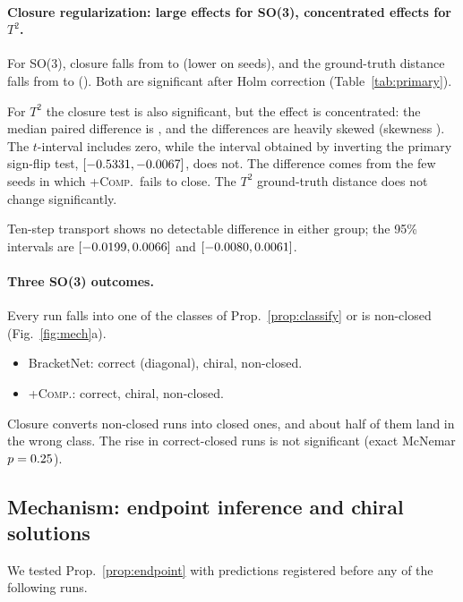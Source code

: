 \paragraph{Closure regularization: large effects for SO(3), concentrated effects for $T^2$.}
For SO(3), closure falls from \NHoneSOthreeMeanb{} to \NHoneSOthreeMeana{} (lower on \NHoneSOthreeWins{} seeds), and
the ground-truth distance falls from \NHtwoSOthreeMeanb{} to \NHtwoSOthreeMeana{} (\NHtwoSOthreeWins{}). Both are
significant after Holm correction (Table~\ref{tab:primary}).

For $T^2$ the closure test is also significant, but the effect is concentrated: the median paired difference is
\RInvHoneTtwoMedian{}, and the differences are heavily skewed (skewness \RInvHoneTtwoSkew). The $t$-interval
includes zero, while the interval obtained by inverting the primary sign-flip test,
$[-0.5331,-0.0067]$, does not. The difference comes from the few seeds in which \textsc{+Comp.}\ fails
to close. The $T^2$ ground-truth distance does not change significantly.

Ten-step transport shows no detectable difference in either group; the 95\% intervals are
$[-0.0199,0.0066]$ and
$[-0.0080,0.0061]$.

\paragraph{Three SO(3) outcomes.}
Every run falls into one of the classes of Prop.~\ref{prop:classify} or is non-closed (Fig.~\ref{fig:mech}a).
\begin{itemize}
\item BracketNet: \NSOthreeBNCatCorrectclosed{} correct (diagonal), \NSOthreeBNChiral{} chiral, \NSOthreeBNCatNonclosed{} non-closed.
\item \textsc{+Comp.}: \NSOthreeCompCatCorrectclosed{} correct, \NSOthreeCompCatIncorrectclosed{} chiral, \NSOthreeCompCatNonclosed{} non-closed.
\end{itemize}
Closure converts non-closed runs into closed ones, and about half of them land in the wrong class. The rise in
correct-closed runs is not significant (exact McNemar $p=0.25$).

\subsection{Mechanism: endpoint inference and chiral solutions}\label{sec:mechanism}
We tested Prop.~\ref{prop:endpoint} with predictions registered before any of the following runs.

